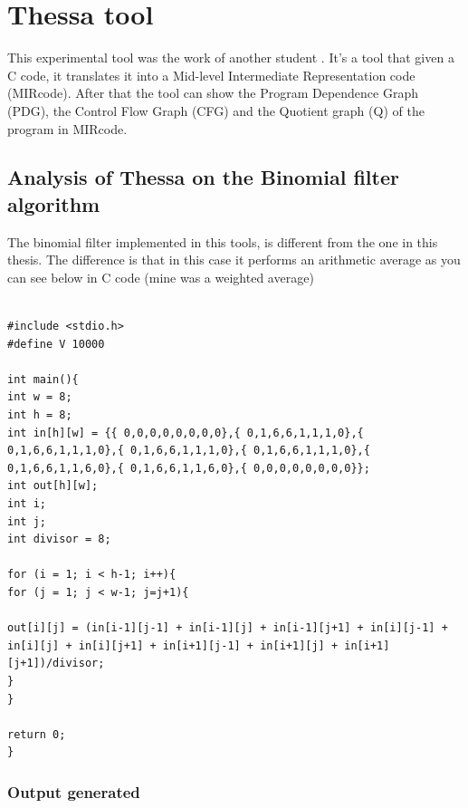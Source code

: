 \chapter{Thessa tool}

 This experimental tool was the work of another student \cite{tessa}.
 It's a tool that given a C code, it translates it into a Mid-level Intermediate Representation code (MIRcode). After that the tool can show the Program Dependence Graph (PDG), the  Control Flow Graph (CFG) and the Quotient graph (Q) of the program in MIRcode. 
\section{Analysis of Thessa on the Binomial filter algorithm}

The binomial filter implemented in this tools, is different from the one in this thesis.
The difference is that in this case it performs an arithmetic average as you can see below in C code (mine was a weighted average)
\lstset{ %
	language=C,
	basicstyle=\footnotesize,
	numbers=left,
	stepnumber=1,
	showstringspaces=false,
	tabsize=1,
	breaklines=true,
	breakatwhitespace=false,
}

\begin{lstlisting}[frame=single]  % Start your 

#include <stdio.h>
#define V 10000

int main(){
int w = 8;
int h = 8;
int in[h][w] = {{ 0,0,0,0,0,0,0,0},{ 0,1,6,6,1,1,1,0},{ 0,1,6,6,1,1,1,0},{ 0,1,6,6,1,1,1,0},{ 0,1,6,6,1,1,1,0},{ 0,1,6,6,1,1,6,0},{ 0,1,6,6,1,1,6,0},{ 0,0,0,0,0,0,0,0}};
int out[h][w];
int i;
int j;
int divisor = 8;

for (i = 1; i < h-1; i++){
for (j = 1; j < w-1; j=j+1){

out[i][j] = (in[i-1][j-1] + in[i-1][j] + in[i-1][j+1] + in[i][j-1] + in[i][j] + in[i][j+1] + in[i+1][j-1] + in[i+1][j] + in[i+1][j+1])/divisor;
}
}

return 0;
}
\end{lstlisting}
\subsection{Output generated}
